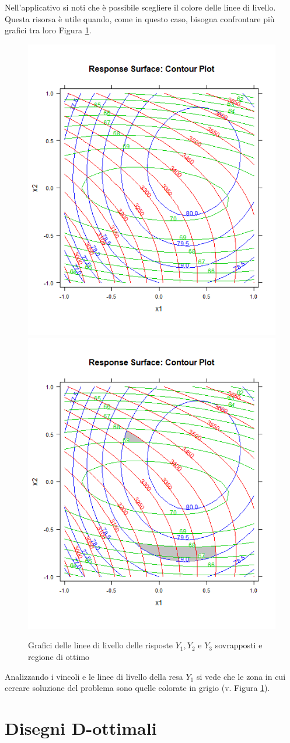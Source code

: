 \documentclass[
  11pt,
]{book}
\begin{document}
Nell'applicativo si noti che è possibile scegliere il colore delle linee di livello. Questa risorsa è utile quando, come in questo caso, bisogna confrontare più grafici tra loro Figura \ref{fig:ccd8}.

\begin{figure}[ht]
\includegraphics[width=0.5\linewidth]{Immagini/CCD/08_livelli} \includegraphics[width=0.5\linewidth]{Immagini/CCD/09_livelli} \caption{Grafici delle linee di livello delle risposte $Y_1,Y_2$ e $Y_3$ sovrapposti e regione di ottimo}\label{fig:ccd8}
\end{figure}

Analizzando i vincoli e le linee di livello della resa \(Y_1\) si vede che le zona in cui cercare soluzione del problema sono quelle colorate in grigio (v. Figura \ref{fig:ccd8}).

\hypertarget{disegni-d-ottimali}{%
\chapter{Disegni D-ottimali}\label{disegni-d-ottimali}}
\end{document}
